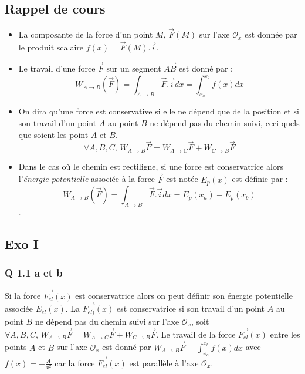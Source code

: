 \documentclass[]{book}
\theoremstyle{definition}
\begin{document}
\subsection*{Rappel de cours}
\begin{itemize}
\item La composante de la force d'un point $M$, $\overrightarrow{F}(M)$ sur l'axe $\mathcal{O}_x$ est donn\'ee par le produit scalaire $f(x) = \overrightarrow{F}(M).\overrightarrow{i}$. 
\item Le travail d'une force $\overrightarrow{F}$ sur un segment $\overrightarrow{AB}$ est donn\'e par :
$$W_{A \to B}(\overrightarrow{F}) = \int_{A \to B} \overrightarrow{F}.\overrightarrow{i}dx = \int_{x_a}^{x_b} f(x)dx$$ 
\item On dira qu'une force est conservative si elle ne d\'epend que de la position et si son travail d'un point $A$ au point $B$ ne d\'epend pas du chemin suivi, ceci quels que soient les point $A$ et $B$.
$$\forall A,B,C,\, W_{A \to B} \overrightarrow{F} = W_{A \to C} \overrightarrow{F} + W_{C \to B} \overrightarrow{F}$$
\item Dans le cas o\`u le chemin est rectiligne, si une force est conservatrice alors l'\emph{\'energie potentielle} associ\'ee \`a la force $\overrightarrow{F}$ est not\'ee $E_p(x)$ est d\'efinie par :
$$W_{A \to B}(\overrightarrow{F}) = \int_{A \to B} \overrightarrow{F}.\overrightarrow{i}dx = E_p(x_a) - E_p(x_b)$$. 
\end{itemize}


\subsection*{Exo I}

\subsubsection*{Q 1.1 a et b}
Si la force $\overrightarrow{F_{el}}(x)$ est conservatrice alors on peut d\'efinir son \'energie potentielle associ\'ee $E_{el}(x)$. La $\overrightarrow{F_{el)}}(x)$ est conservatrice si son travail d'un point $A$ au point $B$ ne d\'epend pas du chemin suivi sur l'axe $\mathcal{O}_x$, soit $\forall A,B,C,\, W_{A \to B} \overrightarrow{F} = W_{A \to C} \overrightarrow{F} + W_{C \to B} \overrightarrow{F}$. Le travail de la force $\overrightarrow{F_{el}}(x)$ entre les points $A$ et $B$ sur l'axe $\mathcal{O}_x$ est donn\'e par $W_{A \to B} \overrightarrow{F} = \int_{x_a}^{x_b} f(x)dx$ avec $f(x) = -\frac{A}{x^2}$ car la force $\overrightarrow{F_{el}}(x)$ est parall\`ele \`a l'axe $\mathcal{O}_x$.\\
\end{document}
